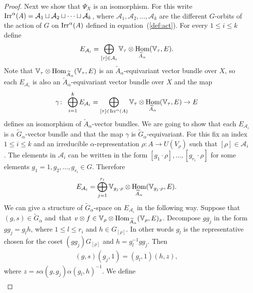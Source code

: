 \documentclass[10pt,a4paper]{amsart}
\def\V{\mathbb{V}}
\DeclareMathOperator{\Hom}{\textup{Hom}}
\DeclareMathOperator{\Irr}{\textup{Irr}}
\theoremstyle{definition}
\numberwithin{equation}{section}
\begin{document}
\begin{proof}
Next we show that $\Psi_{X}$ is an isomorphism. For this write $\Irr^{\alpha}(A)=
\mathcal{A}_{1}\sqcup\mathcal{A}_{2}\sqcup\dots \sqcup\mathcal{A}_{k}$, where
$\mathcal{A}_{1},\mathcal{A}_{2},\dots, \mathcal{A}_{k}$ are the different
$G$-orbits of the action of $G$ on $\Irr^{\alpha}(A)$ defined in equation~(\ref{def:act}).
For every $1\leq i\leq k$ define
\begin{gather*}
E_{\mathcal{A}_{i}}=\bigoplus_{[\tau]\in \mathcal{A}_{i}}
\V_{\tau}\otimes \Hom_{\widetilde{A}_{\alpha}}(\V_{\tau},E).
\end{gather*}
Note that $\V_{\tau}\otimes \Hom_{\widetilde{A}_{\alpha}}(\V_{\tau},E)$ is an
$\widetilde{A}_{\alpha}$-equivariant vector bundle over $X$, so each
$E_{\mathcal{A}_{i}}$ is also an $\widetilde{A}_{\alpha}$-equivariant vector bundle over $X$
and the map
\begin{gather*}
\gamma\colon\ \bigoplus_{i=1}^{k}E_{\mathcal{A}_{i}}=\bigoplus_{[\tau]\in \Irr^{\alpha}(A)}
\V_{\tau}\otimes \Hom_{\widetilde{A}_{\alpha}}(\V_{\tau},E)\rightarrow E
\end{gather*}
defines an isomorphism of $\widetilde{A}_{\alpha}$-vector bundles. We are going to show that each
$E_{\mathcal{A}_{i}}$ is a $\widetilde{G}_{\alpha}$-vector bundle and that the map $\gamma$ is
$\widetilde{G}_{\alpha}$-equivariant. For this fix an index $1\leq i\leq k$ and an irreducible
$\alpha$-representation $\rho\colon A\rightarrow U(V_{\rho})$ such that
$[\rho]\in\mathcal{A}_{i}$. The elements in $\mathcal{A}_{i}$ can be written in the
form $[g_{1}\cdot\rho], \dots, [g_{r_{i}}\cdot\rho]$ for some elements
$g_{1}=1,g_{2},\dots,g_{r_{i}}\in G$. Therefore
\begin{gather*}
E_{\mathcal{A}_{i}}=\bigoplus_{j=1}^{r_{i}}\V_{g_{j}\cdot\rho}\otimes
\Hom_{\widetilde{A}_{\alpha}}(\V_{g_{j}\cdot\rho},E).
\end{gather*}
We can give a structure of
$\widetilde{G}_{\alpha}$-space on $E_{\mathcal{A}_{i}}$ in the following way.
Suppose that $(g,s)\in\widetilde{G}_{\alpha}$ and~that
$v\otimes f\in \V_{\rho}\otimes \Hom_{\widetilde{A}_{\alpha}}(\V_{\rho},E)_{x}$.
Decompose $gg_{j}$ in the form $gg_{j}=g_{l}h$, where $1\leq l\leq r_{i}$ and $h\in G_{[\rho]}$.
In other words $g_{l}$ is the representative chosen for the coset
$(gg_{j})G_{[\rho]}$ and $h=g_{l}^{-1}gg_{j}$. Then
\begin{gather*}
(g,s)(g_{j},1)=(g_{l},1)(h,z),
\end{gather*}
where $z=s\alpha(g,g_{j})\alpha(g_{l},h)^{-1}$. We define
\begin{gather*}

\end{gather*}
\end{proof}
\end{document}
